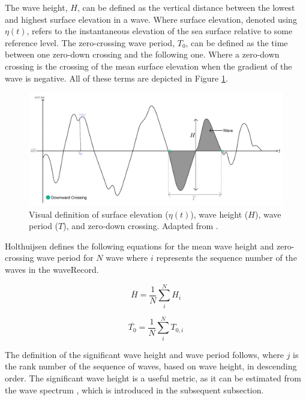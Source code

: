 The wave height, $H$, can be defined as the vertical distance between the lowest and highest surface elevation in a wave. Where surface elevation, denoted using $\eta(t)$, refers to the instantaneous elevation of the sea surface relative to some reference level. The zero-crossing wave period, $T_{0}$, can be defined as the time between one zero-down crossing and the following one. Where a zero-down crossing is the crossing of the mean surface elevation when the gradient of the wave is negative. All of these terms are depicted in Figure \ref{fig:theory.waves.introFigure}.

\begin{figure}[H]
    \centering
    \includegraphics[width=.8\linewidth]{Figures/Theory/placeholder_waveDefinitions.png}
    \caption{Visual definition of surface elevation ($\eta(t)$), wave height ($H$), wave period ($T$), and zero-down crossing. Adapted from \cite{Holthuijsen2007}.}
    \label{fig:theory.waves.introFigure}
\end{figure}

Holthuijsen \cite{Holthuijsen2007} defines the following equations for the mean wave height and zero-crossing wave period for $N$ wave where $i$ represents the sequence number of the waves in the \gls{waveRecord}.

\begin{equation} \label{eq:waves.mean(H)}
    \overline{H} = \frac{1}{N}\sum_{i}^{N}H_{i}
\end{equation}

\begin{equation} \label{eq:waves.mean(T0)}
    \overline{T_{0}} = \frac{1}{N}\sum_{i}^{N}T_{0,i}
\end{equation}

The definition of the significant wave height and wave period follows, where $j$ is the rank number of the sequence of waves, based on wave height, in descending order. The significant wave height is a useful metric, as it can be estimated from the wave spectrum \cite{Holthuijsen2007}, which is introduced in the subsequent subsection.

